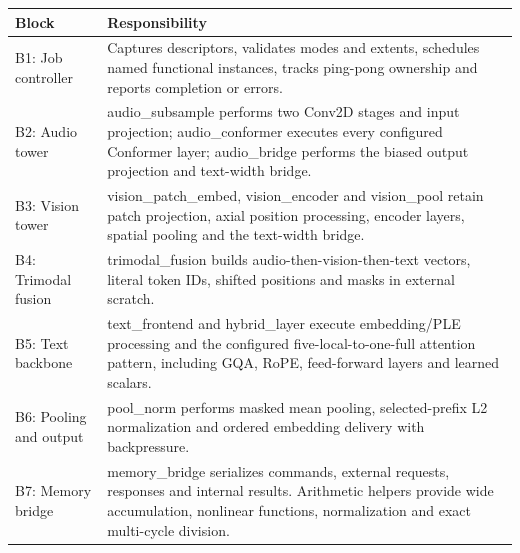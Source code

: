 \documentclass[11pt,a4paper]{article}
\begin{document}
{\small\renewcommand{\arraystretch}{1.18}\begin{longtable}{@{}L{0.24\textwidth}|L{0.7\textwidth}@{}}\toprule

\textbf{Block} & \textbf{Responsibility}\\\midrule\endhead

B1: Job controller & Captures descriptors,\allowbreak{} validates modes and extents,\allowbreak{} schedules named functional instances,\allowbreak{} tracks ping-pong ownership and reports completion or errors.\\[2pt]\hline

B2: Audio tower & audio\_\allowbreak{}subsample performs two Conv2D stages and input projection; audio\_\allowbreak{}conformer executes every configured Conformer layer; audio\_\allowbreak{}bridge performs the biased output projection and text-width bridge.\\[2pt]\hline

B3: Vision tower & vision\_\allowbreak{}patch\_\allowbreak{}embed,\allowbreak{} vision\_\allowbreak{}encoder and vision\_\allowbreak{}pool retain patch projection,\allowbreak{} axial position processing,\allowbreak{} encoder layers,\allowbreak{} spatial pooling and the text-width bridge.\\[2pt]\hline

B4: Trimodal fusion & trimodal\_\allowbreak{}fusion builds audio-then-vision-then-text vectors,\allowbreak{} literal token IDs,\allowbreak{} shifted positions and masks in external scratch.\\[2pt]\hline

B5: Text backbone & text\_\allowbreak{}frontend and hybrid\_\allowbreak{}layer execute embedding/\allowbreak{}PLE processing and the configured five-local-to-one-full attention pattern,\allowbreak{} including GQA,\allowbreak{} RoPE,\allowbreak{} feed-forward layers and learned scalars.\\[2pt]\hline

B6: Pooling and output & pool\_\allowbreak{}norm performs masked mean pooling,\allowbreak{} selected-prefix L2 normalization and ordered embedding delivery with backpressure.\\[2pt]\hline

B7: Memory bridge & memory\_\allowbreak{}bridge serializes commands,\allowbreak{} external requests,\allowbreak{} responses and internal results. Arithmetic helpers provide wide accumulation,\allowbreak{} nonlinear functions,\allowbreak{} normalization and exact multi-cycle division.\\[2pt]\hline

\bottomrule\end{longtable}}
\end{document}
